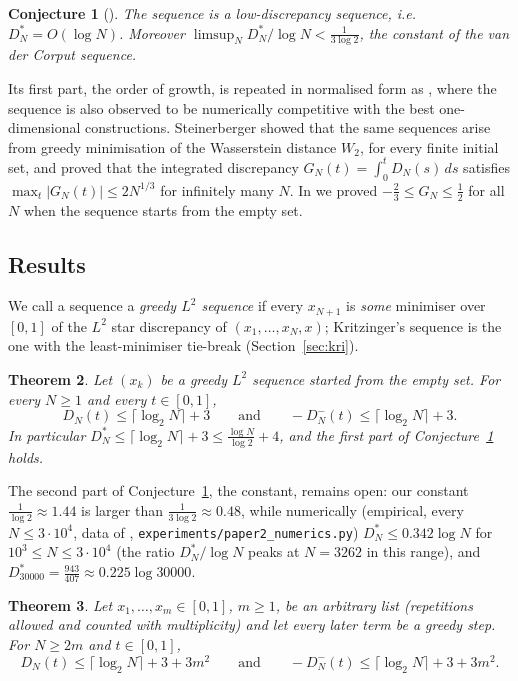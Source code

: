 \documentclass[11pt]{amsart}
\newtheorem{theorem}{Theorem}
\newtheorem{conjecture}[theorem]{Conjecture}
\theoremstyle{remark}
\newcommand{\clog}{\lceil\log_2N\rceil}
\begin{document}
\begin{conjecture}[{\cite[Conjecture 2]{Kri}}]\label{conj:kri}
The sequence is a low-discrepancy sequence, i.e.\ $D_N^*=O(\log N)$. Moreover
$\limsup_N D_N^*/\log N<\frac1{3\log2}$, the constant of the van der Corput
sequence.
\end{conjecture}

Its first part, the order of growth, is repeated in normalised form as
\cite[Conjecture 2.2]{Cle}, where the sequence is also observed to be numerically
competitive with the best one-dimensional constructions. Steinerberger \cite{Ste} showed that the same sequences arise from
greedy minimisation of the Wasserstein distance $W_2$, for every finite initial
set, and proved that the integrated discrepancy
$G_N(t)=\int_0^tD_N(s)\,ds$ satisfies $\max_t|G_N(t)|\le2N^{1/3}$ for infinitely
many $N$. In \cite{Den} we proved $-\frac23\le G_N\le\frac12$ for all $N$ when the
sequence starts from the empty set.

\subsection*{Results}
We call a sequence a \emph{greedy $L^2$ sequence} if every $x_{N+1}$ is
\emph{some} minimiser over $[0,1]$ of the $L^2$ star discrepancy of
$(x_1,\dots,x_N,x)$; Kritzinger's sequence is the one with the least-minimiser
tie-break (Section~\ref{sec:kri}).

\begin{theorem}\label{thm:main}
Let $(x_k)$ be a greedy $L^2$ sequence started from the empty set. For every
$N\ge1$ and every $t\in[0,1]$,
\[
D_N(t)\le\clog+3\qquad\text{and}\qquad -D_N^-(t)\le\clog+3 .
\]
In particular $D_N^*\le\clog+3\le\frac{\log N}{\log2}+4$, and the first part of
Conjecture~\ref{conj:kri} holds.
\end{theorem}

The second part of Conjecture~\ref{conj:kri}, the constant, remains open: our
constant $\frac1{\log2}\approx1.44$ is larger than $\frac1{3\log2}\approx0.48$,
while numerically (empirical, every $N\le3\cdot10^4$, data of \cite{Den},
\texttt{experiments/paper2\_numerics.py})
$D_N^*\le0.342\log N$ for $10^3\le N\le3\cdot10^4$ (the ratio $D_N^*/\log N$ peaks
at $N=3262$ in this range), and
$D_{30000}^*=\frac{943}{407}\approx0.225\log 30000$.

\begin{theorem}\label{thm:from}
Let $x_1,\dots,x_m\in[0,1]$, $m\ge1$, be an arbitrary list (repetitions allowed and
counted with multiplicity) and let every later term be a greedy step. For $N\ge2m$ and $t\in[0,1]$,
\[
D_N(t)\le\clog+3+3m^2\qquad\text{and}\qquad -D_N^-(t)\le\clog+3+3m^2 .
\]
\end{theorem}
\end{document}
